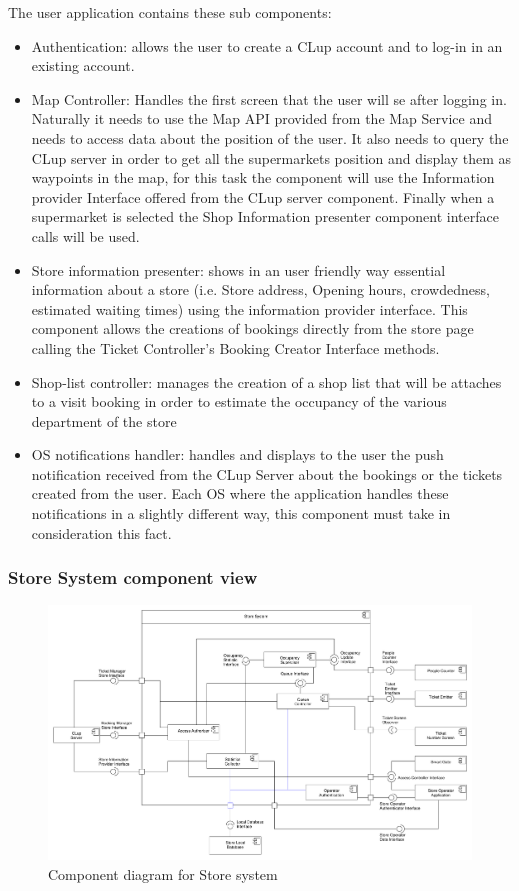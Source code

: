 The user application contains these sub components:
\begin{itemize}
    \item Authentication: allows the user to create a CLup account and to log-in in an existing account.
    \item Map Controller: Handles the first screen that the user will se after logging in. Naturally it needs to use the Map API provided from the Map Service and needs to access data about the position of the user. It also needs to query the CLup server in order to get all the supermarkets position and display them as waypoints in the map, for this task the component will use the Information provider Interface offered from the CLup server component. Finally when a supermarket is selected the Shop Information presenter component interface calls will be used.
    \item Store information presenter: shows in an user friendly way essential information about a store (i.e. Store address, Opening hours, crowdedness, estimated waiting times) using the information provider interface. This component allows the creations of bookings directly from the store page calling the Ticket Controller's Booking Creator Interface methods.
    \item Shop-list controller: manages the creation of a shop list that will be attaches to a visit booking in order to estimate the occupancy of the various department of the store
    \item OS notifications handler: handles and displays to the user the push notification received from the CLup Server about the bookings or the tickets created from the user. Each OS where the application handles these notifications in a slightly different way, this component must take in consideration this fact.
\end{itemize}

\subsubsection{Store System component view}
\begin{figure}[H]
    \includegraphics[width=\textwidth]{Images/UML_store_system_component.pdf}
    \caption{\label{fig:UML_comp_CLup_store_system}Component diagram for Store system}
\end{figure}

